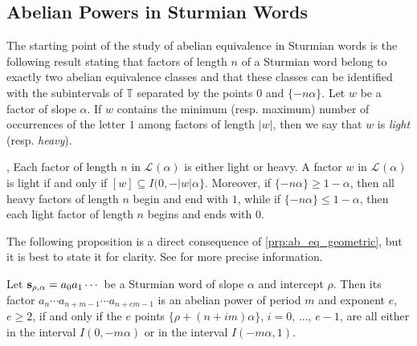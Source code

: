 \documentclass[a4paper,fleqn]{article}
\providecommand{\abs}[1]{\lvert#1\rvert}
\newcommand{\Lang}[2][]{\mathcal{L}_{#1}(#2)}
\newcommand{\infw}[1]{%
  \ifcat\noexpand#1\relax\bm{#1}%
  \else\mathbf{#1}\fi}          %
\newcommand{\T}{\mathbb{T}}
\begin{document}
  \subsection{Abelian Powers in Sturmian Words}
  The starting point of the study of abelian equivalence in Sturmian words is the following result stating that factors
  of length $n$ of a Sturmian word belong to exactly two abelian equivalence classes and that these classes can be
  identified with the subintervals of $\T$ separated by the points $0$ and $\{-n\alpha\}$. Let $w$ be a factor of slope
  $\alpha$. If $w$ contains the minimum (resp. maximum) number of occurrences of the letter $1$ among factors of length
  $\abs{w}$, then we say that $w$ is \emph{light} (resp. \emph{heavy}).

  \begin{proposition}\label{prp:ab_eq_geometric}
    \cite[Prop.~3.3]{2016:abelian_powers_and_repetitions_in_sturmian_words},
    \cite[Thm.~19]{2013:some_properties_of_abelian_return_words}
    Each factor of length $n$ in $\Lang{\alpha}$ is either light or heavy. A factor $w$ in $\Lang{\alpha}$ is light if
    and only if $[w] \subseteq I(0, -\abs{w}\alpha\}$. Moreover, if $\{-n\alpha\} \geq 1 - \alpha$, then all heavy
    factors of length $n$ begin and end with $1$, while if $\{-n\alpha\} \leq 1 - \alpha$, then each light factor of
    length $n$ begins and ends with $0$.
  \end{proposition}

  The following proposition is a direct consequence of \autoref{prp:ab_eq_geometric}, but it is best to state it for
  clarity. See \cite[Lemma~4.2]{2016:abelian_powers_and_repetitions_in_sturmian_words} for more precise information.

  \begin{proposition}\label{prp:ab_eq_geometric_2}
    Let $\infw{s}_{\rho,\alpha} = a_0 a_1 \cdots$ be a Sturmian word of slope $\alpha$ and intercept $\rho$. Then its
    factor $a_n \cdots a_{n+m-1} \cdots a_{n+em-1}$ is an abelian power of period $m$ and exponent $e$, $e \geq 2$, if
    and only if the $e$ points $\{\rho + (n + im)\alpha\}$, $i = 0$, $\ldots$, $e - 1$, are all either in the interval
    $I(0, -m\alpha)$ or in the interval $I(-m\alpha, 1)$.
  \end{proposition}
\end{document}
